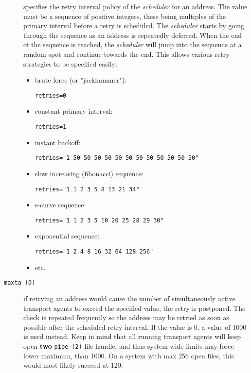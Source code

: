 \begin{description}
specifies the retry interval 
policy of the {\em scheduler\/} for an address. The value must be a sequence 
of positive integers, these being multiples of the primary interval before a 
retry is scheduled. The {\em scheduler\/} starts by going through the 
sequence as an address is repeatedly deferred. When the end of the sequence 
is reached, the {\em scheduler\/} will jump into the sequence at a random 
spot and continue towards the end. This allows various retry strategies to be 
specified easily:
\begin{itemize}
\item brute force (or "jackhammer"):
\begin{verbatim}
retries=0
\end{verbatim}
\item constant primary interval:
\begin{verbatim}
retries=1
\end{verbatim}
\item instant backoff:
\begin{verbatim}
retries="1 50 50 50 50 50 50 50 50 50 50 50 50"
\end{verbatim}
\item slow increasing (fibonacci) sequence:
\begin{verbatim}
retries="1 1 2 3 5 8 13 21 34"
\end{verbatim}
\item s-curve sequence:
\begin{verbatim}
retries="1 1 2 3 5 10 20 25 28 29 30"
\end{verbatim}
\item exponential sequence:
\begin{verbatim}
retries="1 2 4 8 16 32 64 128 256"
\end{verbatim}
\item etc.
\end{itemize}




\item[{\tt maxta (0)}] \mbox{}

if retrying an address would cause the number of 
simultaneously active transport agents to exceed the specified value, 
the retry is postponed. The check is repeated frequently so the address 
may be retried as soon as possible after the scheduled retry interval. 
If the value is 0, a value of 1000 is used instead. Keep in mind that all 
running transport agents will keep open {\bf two} {\tt pipe (2)} 
file-handle, and thus system-wide limits may force lower maximum, than 1000.
On a system with max 256 open files, this would most likely succeed at 120.




\end{description}
